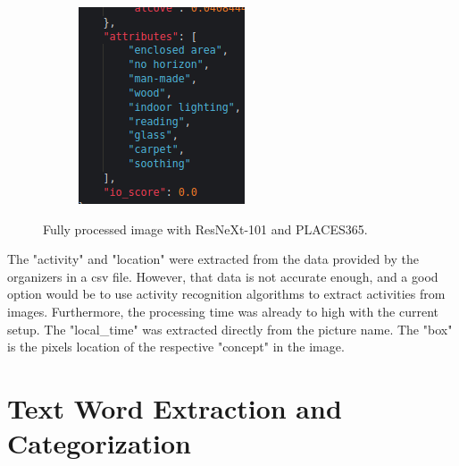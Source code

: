 \begin{figure}[H]
\begin{subfigure}{0.3\textwidth}
      \end{subfigure}
      \begin{subfigure}{0.3\textwidth}
        \includegraphics[width=\textwidth]{Sections/4InitialWork/4_images_random/res3.png}
        \end{subfigure}
      \caption{Fully processed image with ResNeXt-101 and PLACES365.}
      \label{fig:image_fully_processed_resnext}
      \end{figure}


      The "activity" and "location" were extracted from the data provided by the organizers in a csv file. However,  that data is not accurate enough, and a good option would be to use activity recognition algorithms to extract activities from images. Furthermore, the processing time was already to high with the current setup.
      The "local\_time" was extracted directly from the picture name.
      The "box" is the pixels location of the respective "concept" in the image.



\newpage
\section{Text Word Extraction and Categorization}
\label{sec:text}

